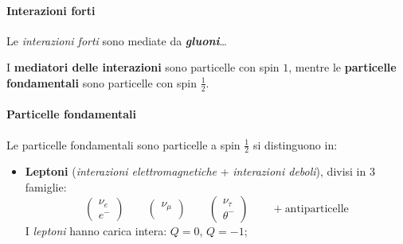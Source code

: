 \paragraph{Interazioni forti}
Le \textit{interazioni forti} sono mediate da \textbf{\textit{gluoni}}\dots

I \textbf{mediatori delle interazioni} sono particelle con spin $1$, mentre le
\textbf{particelle fondamentali} sono particelle con spin $\frac{1}{2}$.

\paragraph{Particelle fondamentali}
Le particelle fondamentali sono particelle a spin $\frac{1}{2}$ si distinguono
in:
\begin{itemize}
  \item \textbf{Leptoni} (\textit{interazioni elettromagnetiche} +
    \textit{interazioni deboli}), divisi in $3$ famiglie:
    \[
      \begin{pmatrix}
        \nu_e \\ e^-
      \end{pmatrix}
      \qquad
      \begin{pmatrix}
        \nu_{\mu} \\ 
      \end{pmatrix}
      \qquad
      \begin{pmatrix}
        \nu_{\tau} \\ \theta^-
      \end{pmatrix}
      \qquad
      + \text{antiparticelle}
    \]
    I \textit{leptoni} hanno carica intera: $Q = 0$, $Q = -1$;


\end{itemize}
